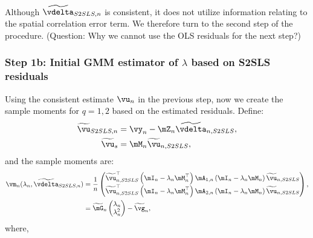 Although $\widetilde{\vdelta}_{S2SLS, n}$ is consistent, it does not utilize information relating to the spatial correlation error term. We therefore turn to the second step of the procedure. (Question: Why we cannot use the OLS residuals for the next step?)


\subsubsection{Step 1b: Initial GMM estimator of $\lambda$ based on S2SLS residuals}

Using the consistent estimate $\vu_n$ in the previous step, now we create the sample moments for $q= 1, 2$ based on the estimated residuals. Define:
\begin{equation*}
\begin{aligned}
\widetilde{\vu}_{S2SLS, n} & = \vy_n - \mZ_n\widetilde{\vdelta}_{n, S2SLS}, \\
\widetilde{\vu}_{s}        & = \mM_n\widetilde{\vu}_{n, S2SLS},
\end{aligned}
\end{equation*}
%
and the sample moments are:
\begin{equation}\label{eq:momdent_conditions_step}
	\begin{aligned}
		\vm_n(\lambda_n,\widetilde{\vdelta}_{S2SLS, n}) & = \frac{1}{n}
		\begin{pmatrix}
		\widetilde{\vu}_{n, S2SLS}^\top \left(\mI_n - \lambda_n\mM^\top_n\right)\mA_{1,n}\left(\mI_n - \lambda_n\mM_n\right)\widetilde{\vu}_{n, S2SLS} \\
		\widetilde{\vu}_{n, S2SLS}^\top \left(\mI_n - \lambda_n\mM^\top_n\right)\mA_{2,n}\left(\mI_n - \lambda_n\mM_n\right)\widetilde{\vu}_{n, S2SLS}
		\end{pmatrix}, \\
		& = \widetilde{\mG}_n\begin{pmatrix} \lambda_n \\
                \lambda^2_n
\end{pmatrix} - \widetilde{\vg}_n,
	\end{aligned}
\end{equation}
%
where,
